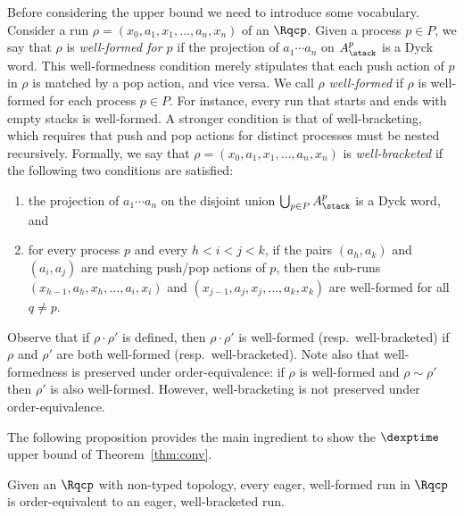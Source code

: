 \documentclass{LMCS}
\newenvironment{proposition}{\begin{prop}}{\end{prop}}
\begin{document}
Before considering the upper bound we need to introduce some
vocabulary. Consider a run $\rho = (x_0,a_1,x_1,\ldots,a_n,x_n)$ of an
\rqcp $\Rqcp$.  Given a process $p\in P$, we say that $\rho$ is
\emph{well-formed for $p$} if the projection of $a_1 \cdots
a_n$ on $A^p_\stack$ is a  Dyck word.  This
well-formedness condition merely stipulates that each push action of
$p$ in $\rho$ is matched by a pop action, and vice versa.  We
call $\rho$ \emph{well-formed} if $\rho$ is well-formed for each
process $p \in P$.  For instance, every run that starts and ends with
empty stacks  is well-formed.  A stronger condition is that of
well-bracketing, which requires that push and pop actions for distinct
processes must be nested recursively.
Formally, we say that $\rho = (x_0,a_1,x_1,\ldots,a_n,x_n)$ is
\emph{well-bracketed} if the following two conditions are satisfied:
\begin{enumerate}
\item
  the projection of $a_1 \cdots a_n$ on the disjoint union
  $\bigcup_{p \in P} A^p_\stack$ is a Dyck word, and
\item
  for every process $p$ and every $h < i < j < k$,
  if the pairs $(a_h,a_k)$ and $(a_i,a_j)$ are matching push/pop actions
  of $p$, then the sub-runs $(x_{h-1},a_h,x_h,\ldots,a_i,x_i)$ and
  $(x_{j-1},a_j,x_j,\ldots,a_k,x_k)$ are
  well-formed for all $q \neq p$.
\end{enumerate}
Observe that if $\rho\cdot\rho'$ is defined, then $\rho\cdot\rho'$ is
well-formed (resp.~well-bracketed) if  $\rho$ and $\rho'$ are both
well-formed (resp.~well-bracketed).  Note also that well-formedness is
preserved under order-equivalence: if $\rho$ is well-formed and $\rho
\sim \rho'$ then $\rho'$ is also well-formed.  However,
well-bracketing is not preserved under order-equivalence.


The following proposition provides the main ingredient to show the
$\dexptime$ upper bound of Theorem~\ref{thm:conv}.

\begin{proposition} \label{prop:wf-to-wb-for-confluent} Given an \rqcp
  $\Rqcp$ with non-\converging typed topology, every eager,
  well-formed run in $\Rqcp$ is
  order-equivalent to an eager, well-bracketed run. 
\end{proposition}
\end{document}
